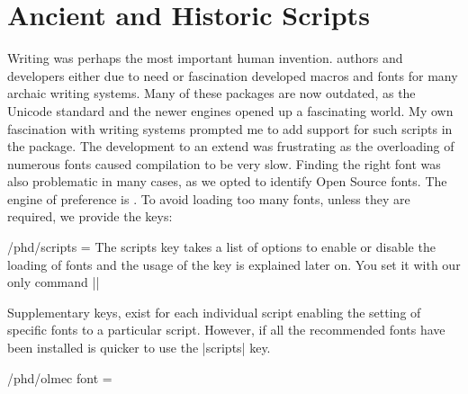 
\pagestyle{headings}

\chapter{Ancient and Historic Scripts}

Writing was perhaps the most important human invention. \tex authors and developers either due to need or fascination developed macros and fonts for many archaic writing systems. Many of these packages are now outdated, as the Unicode standard and the newer engines opened up a fascinating world. My own fascination with writing systems prompted me to add support for such scripts in the  package. The development to an extend was frustrating as the overloading of numerous fonts caused compilation to be very slow. Finding the right font was also problematic in many cases, as we opted to identify Open Source fonts. The \tex engine of preference is \luatex. To avoid loading too many fonts, unless they are required, we provide the keys:

\def\loadscripts{}
\cxset{scripts/.store in = \loadscripts}

\begin{key}{/phd/scripts = } The scripts key takes a list of options to enable or disable the loading of fonts and the usage of the key is explained later on. You set it with our only command |\cxset|
\end{key}

Supplementary keys, exist for each individual script enabling the setting of specific fonts to a particular script. However, if all the recommended fonts have been installed is quicker to use the |scripts| key.

\def\olmecfontstore{}

\cxset{olmec font/.store in=\olmecfontstore}


\begin{key}{/phd/olmec font = }
\end{key}


